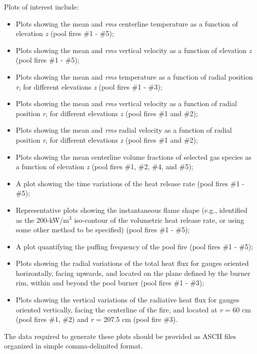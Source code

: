 \documentclass[12pt]{article}
\begin{document}
\newpage
Plots of interest include:
\begin{itemize}[noitemsep]
\item Plots showing the mean and {\it rms} centerline temperature as a function of elevation {\it z} (pool fires \#1 - \#5);
\item Plots showing the mean and {\it rms} vertical velocity as a function of elevation {\it z} (pool fires \#1 - \#5);
\item Plots showing the mean and {\it rms} temperature as a function of radial position {\it r}, for different elevations {\it z} (pool fires \#1 - \#3);
\item Plots showing the mean and {\it rms} vertical velocity as a function of radial position {\it r}, for different elevations {\it z}  (pool fires \#1 and \#2);
\item Plots showing the mean and {\it rms} radial velocity as a function of radial position {\it r}, for different elevations {\it z} (pool fires \#1 and \#2);
\item Plots showing the mean centerline volume fractions of selected gas species as a function of elevation {\it z} (pool fires \#1, \#2, \#4, and \#5);
\item A plot showing the time variations of the heat release rate (pool fires \#1 - \#5);
\item Representative plots showing the instantaneous flame shape (e.g., identified as the 200-kW/m$^3$ iso-contour of the volumetric heat release rate, or using some other method to be specified) (pool fires \#1 - \#5);
\item A plot quantifying the puffing frequency of the pool fire (pool fires \#1 - \#5);
\item Plots showing the radial variations of the total heat flux for gauges oriented horizontally, facing upwards, and located on the plane defined by the burner rim, within and beyond the pool burner (pool fires \#1 - \#3);
\item Plots showing the vertical variations of the radiative heat flux for gauges oriented vertically, facing the centerline of the fire, and located at {\it r} = 60 cm (pool fires \#1, \#2) and {\it r} = 207.5 cm (pool fire \#3).
 \end{itemize}

The data required to generate these plots should be provided as ASCII files organized in simple comma-delimited format.
\end{document}
